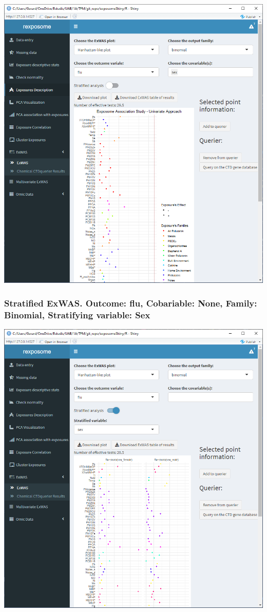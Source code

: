 \documentclass[
]{book}
\begin{document}
\includegraphics{images/analysis7_2.png}

\hypertarget{stratified-exwas.-outcome-flu-cobariable-none-family-binomial-stratifying-variable-sex}{%
\subsubsection{Stratified ExWAS. Outcome: flu, Cobariable: None, Family: Binomial, Stratifying variable: Sex}\label{stratified-exwas.-outcome-flu-cobariable-none-family-binomial-stratifying-variable-sex}}

\includegraphics{images/analysis7_2_1.png}
\end{document}
